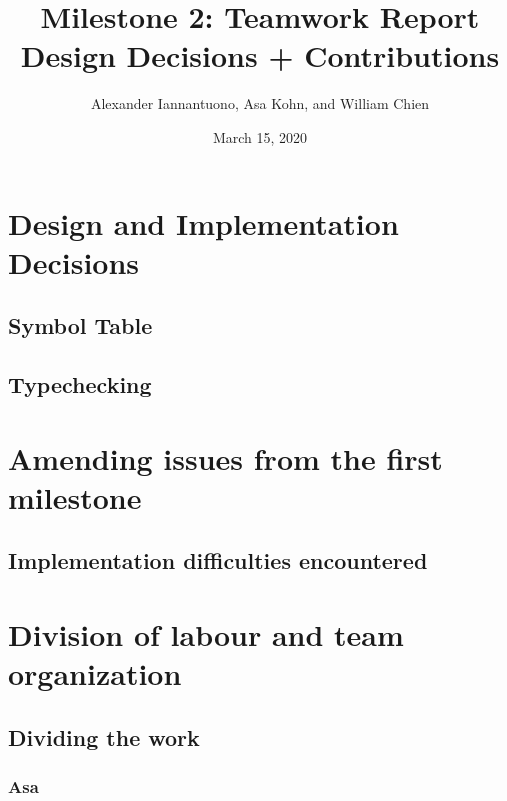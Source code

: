 \documentclass{article}
\title{
    Milestone 2: Teamwork Report\\
    \large Design Decisions + Contributions
}
\author{Alexander Iannantuono, Asa Kohn, and William Chien}
\date{March 15, 2020}
\begin{document}
\maketitle

%
%

\section{Design and Implementation Decisions}

\subsection{Symbol Table}

\subsection{Typechecking}

\section{Amending issues from the first milestone}

\subsection{Implementation difficulties encountered}

\section{Division of labour and team organization}

\subsection{Dividing the work}


\subsubsection{Asa}
\end{document}
